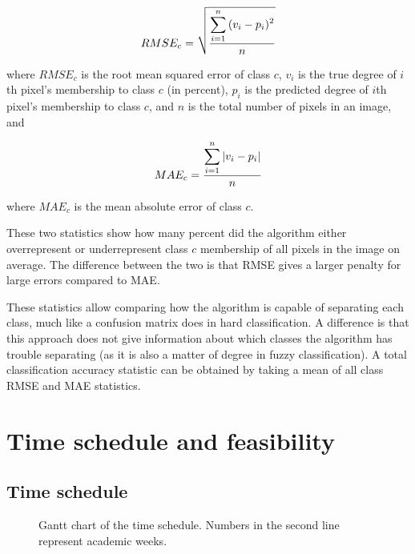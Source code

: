 \documentclass[a4paper,10pt]{article}
\begin{document}
$$ RMSE_c = \sqrt{ \displaystyle\sum_{i=1}^{n}{ (v_{i} - p_{i})^2 } \over{n} } $$

where $ RMSE_c $ is the root mean squared error of class $ c $, $ v_{i} $ is the true degree of $ i $th pixel's membership to class $ c $ (in percent), $ p_i $ is the predicted degree of $ i $th pixel's membership to class $ c $, and $ n $ is the total number of pixels in an image, and

$$ MAE_c = {\displaystyle\sum_{i=1}^{n}{ |v_{i} - p_{i}| } \over{n}} $$

where $ MAE_c $ is the mean absolute error of class $ c $.

These two statistics show how many percent did the algorithm either overrepresent or underrepresent class $ c $ membership of all pixels in the image on average. The difference between the two is that RMSE gives a larger penalty for large errors compared to MAE.

These statistics allow comparing how the algorithm is capable of separating each class, much like a confusion matrix does in hard classification. A difference is that this approach does not give information about which classes the algorithm has trouble separating (as it is also a matter of degree in fuzzy classification). A total classification accuracy statistic can be obtained by taking a mean of all class RMSE and MAE statistics.

\section{Time schedule and feasibility}

\subsection{Time schedule}

\begin{figure}
  \caption{Gantt chart of the time schedule. Numbers in the second line represent academic weeks.}
  \label{fig-gantt}
\end{figure}
\end{document}
